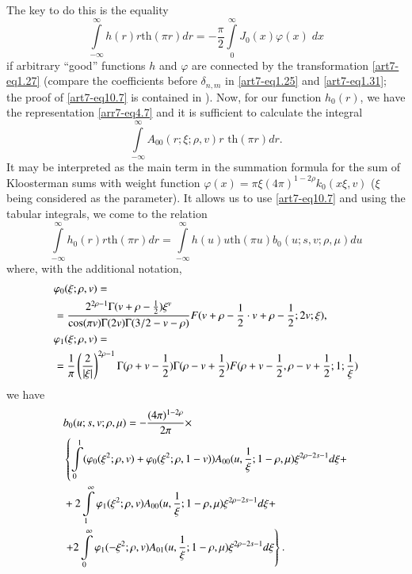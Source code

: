 The key to do this is the equality
\setcounter{section}{10}
\begin{equation}
\int\limits^\infty_{-\infty} h(r) r \text{th} (\pi r) dr = -\frac{\pi}{2} \int\limits^\infty_0 J_0(x) \varphi (x) \; d x\label{art7-eq10.7} 
\end{equation}
if arbitrary ``good'' functions $h$ and $\varphi$ are connected by the transformation \eqref{art7-eq1.27} (compare the coefficients before $\delta_{n,m}$ in \eqref{art7-eq1.25} and \eqref{art7-eq1.31}; the proof of \eqref{art7-eq10.7} is contained in \cite{arr7-key1}). Now, for our function $h_0(r)$, we have the representation \eqref{arr7-eq4.7} and it is sufficient to calculate the integral
\begin{equation}
\int\limits^\infty_{-\infty} A_{00} (r;\xi; \rho, v) r \text{ th} (\pi r) d r. \label{art7-eq10.8}
\end{equation}
It may be interpreted as the main term in the summation formula for the sum of Kloosterman sums with weight function $\varphi (x) = \pi \xi (4 \pi)^{1-2\rho} k_0 (x \xi, v)$ ($\xi$ being considered as the parameter). It allows us to use \eqref{art7-eq10.7} and using the tabular integrals, we come to the relation 
\begin{equation}
\int\limits^\infty_{-\infty} h_0 (r) r \text{th} (\pi r) dr = \int\limits^\infty_{-\infty} h (u) u \text{th} (\pi u) b_0 (u; s, v; \rho, \mu) du \label{art7-eq10.9}
\end{equation}
where, with the additional notation,
\begin{align}
&\varphi_0 (\xi; \rho, v)  = \label{art7-eq10.10}\\
& = \frac{2^{2\rho -1} \Gamma (v+ \rho - \frac{1}{2}) \xi^v}{\cos (\pi v) \Gamma (2v) \Gamma (3/2 - v-\rho)} F (v+ \rho - \frac{1}{2} \cdot v + \rho - \frac{1}{2} ; 2 v ; \xi),  \notag\\
&\varphi_1 (\xi; \rho, v) = \label{art7-eq10.11}\\
& =\frac{1}{\pi} \left(\frac{2}{|\xi|} \right)^{2\rho-1} \Gamma (\rho + v - \frac{1}{2}) \Gamma (\rho - v + \frac{1}{2}) F (\rho + v -\frac{1}{2}, \rho - v + \frac{1}{2}; 1 ; \frac{1}{\xi}) \notag
\end{align}\pageoriginale 
we have
\begin{align}
& b_0 (u; s, v; \rho, \mu) = - \frac{(4\pi)^{1-2 \rho}}{2 \pi }\times \label{art7-eq10.12}\\
& \left\{\int\limits^1_0 (\varphi_0 (\xi^2; \rho, v) + \varphi_0 (\xi^2; \rho, 1-v)) A_{00} (u, \frac{1}{\xi}; 1 - \rho, \mu) \xi^{2\rho - 2 s -1} d \xi +  \right. \notag\\
&+ 2 \int\limits^\infty_1 \varphi_1(\xi^2; \rho, v) A_{00} (u, \frac{1}{\xi}; 1 - \rho, \mu) \xi^{2 \rho - 2 s -1} d \xi + \notag \\
&\left. + 2 \int\limits^\infty_0 \varphi_1 (-\xi^2 ; \rho, v) A_{01} (u, \frac{1}{\xi}; 1 - \rho, \mu)  \xi^{2\rho - 2 s -1} d \xi \right\}. \notag
\end{align}

